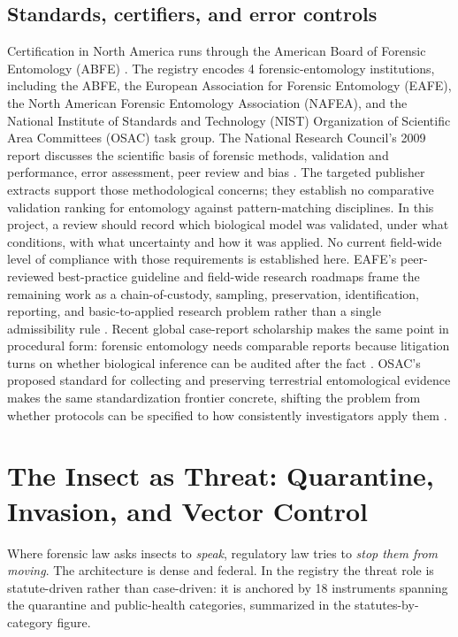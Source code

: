 \documentclass[
  english,
]{article}
\begin{document}
\subsection{Standards, certifiers, and error
controls}\label{standards-certifiers-and-error-controls}

Certification in North America runs through the American Board of
Forensic Entomology (ABFE) \citep{abfe_cert}. The registry encodes 4
forensic-entomology institutions, including the ABFE, the European
Association for Forensic Entomology (EAFE), the North American Forensic
Entomology Association (NAFEA), and the National Institute of Standards
and Technology (NIST) Organization of Scientific Area Committees (OSAC)
task group. The National Research Council's 2009 report discusses the
scientific basis of forensic methods, validation and performance, error
assessment, peer review and bias \citep{nas2009forensic}. The targeted
publisher extracts support those methodological concerns; they establish
no comparative validation ranking for entomology against
pattern-matching disciplines. In this project, a review should record
which biological model was validated, under what conditions, with what
uncertainty and how it was applied. No current field-wide level of
compliance with those requirements is established here. EAFE's
peer-reviewed best-practice guideline and field-wide research roadmaps
frame the remaining work as a chain-of-custody, sampling, preservation,
identification, reporting, and basic-to-applied research problem rather
than a single admissibility rule
\citep{amendt2007bestpractice, tomberlin2011roadmap}. Recent global
case-report scholarship makes the same point in procedural form:
forensic entomology needs comparable reports because litigation turns on
whether biological inference can be audited after the fact
\citep{kotze2021case_report}. OSAC's proposed standard for collecting
and preserving terrestrial entomological evidence makes the same
standardization frontier concrete, shifting the problem from whether
protocols can be specified to how consistently investigators apply them
\citep{osac2025entomological_evidence}.

\newpage

\section{The Insect as Threat: Quarantine, Invasion, and Vector
Control}\label{sec:threat}

Where forensic law asks insects to \emph{speak}, regulatory law tries to
\emph{stop them from moving}. The architecture is dense and federal. In
the registry the threat role is statute-driven rather than case-driven:
it is anchored by 18 instruments spanning the quarantine and
public-health categories, summarized in the statutes-by-category figure.
\end{document}
